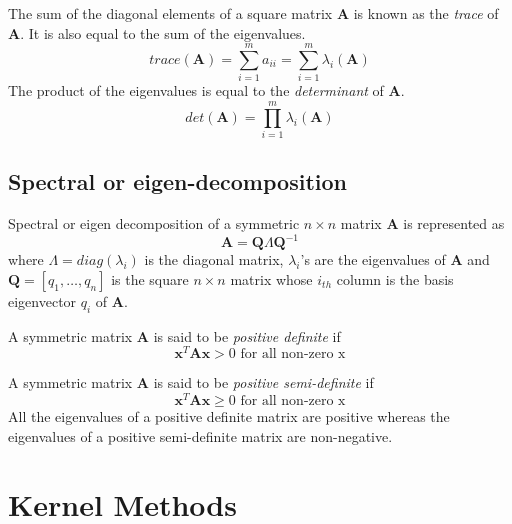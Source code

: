 The sum of the diagonal elements of a square matrix $\mathbf{A}$ is known as the \textit{trace} of $\mathbf{A}$. It is also equal to the sum of the eigenvalues.  
\begin{displaymath}
    trace(\mathbf{A}) = \sum_{i=1}^{m}a_{ii}=\sum_{i=1}^{m}\lambda_{i}(\mathbf{A}) 
\end{displaymath}
The product of the eigenvalues is equal to the \textit{determinant} of $\mathbf{A}$.
\begin{displaymath}
    det(\mathbf{A}) = \prod_{i=1}^{m}\lambda_{i}(\mathbf{A}) 
\end{displaymath}

\subsection{Spectral or eigen-decomposition}
Spectral or eigen decomposition of a symmetric $n \times n$ matrix $\mathbf{A}$ is represented as
\begin{displaymath}
    \mathbf{A} = \mathbf{Q} \Lambda \mathbf{Q}^{-1}  
\end{displaymath}
where $\Lambda = diag(\lambda_{i})$ is the diagonal matrix, $\lambda_{i}$'s are the eigenvalues of $\mathbf{A}$ and $\mathbf{Q}=[q_{1},\dots,q_{n}]$ is the square $n \times n$ matrix whose $i_{th}$ column is the basis eigenvector $q_{i}$ of $\mathbf{A}$.
  
A symmetric matrix $\mathbf{A}$ is said to be \textit{positive definite} if
\begin{displaymath}
    \mathbf{x}^{T}\mathbf{A}\mathbf{x} > 0 \mbox{ for all non-zero x}  
\end{displaymath}

A symmetric matrix $\mathbf{A}$ is said to be \textit{positive semi-definite} if
\begin{displaymath}
    \mathbf{x}^{T}\mathbf{A}\mathbf{x} \geq 0 \mbox{ for all non-zero x}  
\end{displaymath}
All the eigenvalues of a positive definite matrix are positive whereas the eigenvalues of a positive semi-definite matrix are non-negative.  

\section{Kernel Methods} \label{kern_methods}

